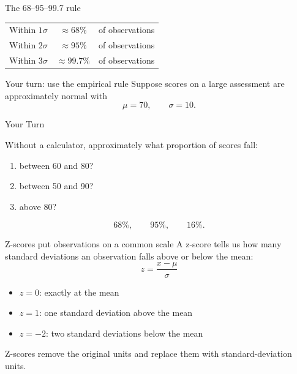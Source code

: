 \documentclass[11pt,aspectratio=169]{beamer}
\newcommand{\yourturn}[1]{%
\begin{center}
\begin{minipage}{0.90\textwidth}
\begin{alertblock}{Your Turn}
#1
\end{alertblock}
\end{minipage}
\end{center}}
\begin{document}
\begin{frame}{The 68--95--99.7 rule}
\begin{center}
\end{center}

\vspace{-0.4em}
\begin{center}
\begin{tabular}{ccl}
Within $1\sigma$ & $\approx 68\%$ & of observations \\
Within $2\sigma$ & $\approx 95\%$ & of observations \\
Within $3\sigma$ & $\approx 99.7\%$ & of observations
\end{tabular}
\end{center}
\end{frame}

\begin{frame}{Your turn: use the empirical rule}
Suppose scores on a large assessment are approximately normal with
\[
\mu=70,\qquad \sigma=10.
\]

\yourturn{
Without a calculator, approximately what proportion of scores fall:
\begin{enumerate}
  \item between 60 and 80?
  \item between 50 and 90?
  \item above 80?
\end{enumerate}}

\pause
\vfill
\[
\boxed{68\%},\qquad \boxed{95\%},\qquad \boxed{16\%}.
\]
\end{frame}

\begin{frame}{Z-scores put observations on a common scale}
A z-score tells us how many standard deviations an observation falls above or below the mean:
\[
\boxed{z=\frac{x-\mu}{\sigma}}
\]

\begin{itemize}
  \item $z=0$: exactly at the mean
  \item $z=1$: one standard deviation above the mean
  \item $z=-2$: two standard deviations below the mean
\end{itemize}

\vfill
Z-scores remove the original units and replace them with \alert{standard-deviation units}.
\end{frame}
\end{document}
